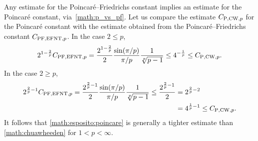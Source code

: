 \documentclass[10pt,letterpaper]{article}
\begin{document}
\begin{remark}
    Any estimate for the Poincar\'e--Friedrichs constant implies an estimate for the Poincar\'e constant, via~\eqref{math:p_vs_pf}. 
    Let us compare the estimate $C_{{\rm P},{\rm CW},p}$ for the Poincar\'e constant
    with the estimate obtained from the Poincar\'e--Friedrichs constant $C_{{\rm PF},{\rm EFNT},p}$. 
    In the case $2 \leq p$, 
    \begin{align*}
        2^{1-\frac 2 p}
        C_{{\rm PF},{\rm EFNT},p}
        =
        \frac{ 2^{1-\frac 2 p} }{2}
        \frac{ \sin(\pi/p) }{ \pi/p }
        \frac{ 1 }{ \sqrt[p]{p-1} }
        \leq 
        4^{-\frac 1 p}
        \leq
        C_{{\rm P},{\rm CW},p} 
        .
    \end{align*}
    In the case $2 \geq p$, 
    \begin{align*}
        2^{\frac 2 p - 1}
        C_{{\rm PF},{\rm EFNT},p}
        =
        \frac{ 2^{\frac 2 p - 1} }{2}
        \frac{ \sin(\pi/p) }{ \pi/p }
        \frac{ 1 }{ \sqrt[p]{p-1} }
        \leq
        \frac{ 2^{\frac 2 p-1} }{2}
        &
        =
        2^{\frac 2 p - 2}
        \\&
        =
        4^{\frac 1 p - 1}
        \leq
        C_{{\rm P},{\rm CW},p} 
        .
    \end{align*}
    It follows that \eqref{math:esposito:poincare} is generally a tighter estimate than \eqref{math:chuawheeden} for $1 < p < \infty$.

\end{remark}
\end{document}
